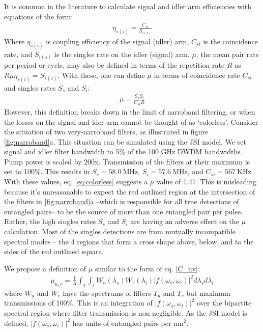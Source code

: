 \documentclass[11pt]{caltech_thesis} %
\begin{document}
It is common in the literature to calculate signal and idler arm efficiencies with equations of the form:
\begin{align}
\eta_{s(i)}=\frac{C_{s i}}{S_{i(s)}} \label{regular_eff}
\end{align}
Where $\eta_{s(i)}$ is coupling efficiency of the signal (idler) arm, $C_{s i}$ is the coincidence rate, and $S_{i(s)}$ is the singles rate on the idler (signal) arm. $\mu$, the mean pair rate per period or cycle, may also be defined in terms of the repetition rate $R$ as $R \mu \eta_{s(i)}=S_{s(i)}$. With these, one can define $\mu$ in terms of coincidence rate $C_{s i}$ and singles rates $S_s$ and $S_i$:
\begin{align}
    \mu=\frac{S_s S_i}{C_{s i} R} \label{eq:colorless}
\end{align}
However, this definition breaks down in the limit of narroband filtering, or when the losses on the signal and ider arm cannot be thought of as `colorless'. Consider the situation of two very-narroband filters, as illustrated in figure \ref{fig:narroband}a. This situation can be simulated using the JSI model. We set signal and idler filter bandwidth to 5\% of the 100 GHz DWDM bandwidths. Pump power is scaled by 200x. Transmission of the filters at their maximum is set to 100\%. This results in $S_s = 58.0~\mathrm{MHz}$, $S_i = 57.6~\mathrm{MHz}$, and $C_{s i} = 567~\mathrm{KHz}$. With these values, eq. \ref{eq:colorless} suggests a $\mu$ value of 1.47. This is misleading because it's unreasonable to expect the red outlined region at the intersection of the filters in \ref{fig:narroband}a --which is responsible for all true detections of entangled pairs-- to be the source of more than one entangled pair per pulse. Rather, the high singles rates $S_s$ and $S_i$ are having an adverse effect on the $\mu$ calculation. Most of the singles detections are from mutually incompatible spectral modes -- the 4 regions that form a cross shape above, below, and to the sides of the red outlined square.

We propose a definition of $\mu$ similar to the form of eq. \ref{C_uv}:
\begin{align}
    \mu_{u,v} = \frac{1}{R}\int_{s}\int_{i}W_u(\lambda_s)W_v(\lambda_i)|f(\omega_s, \omega_i)|^2 d\lambda_s d\lambda_i \label{newmu}
\end{align}
where $W_u$ and $W_v$ have the spectrums of filters $T_u$ and $T_v$ but maximum transmissions of 100\%. This is an integration of $|f(\omega_s, \omega_i)|^2$ over the bipartite spectral region where filter transmission is non-negligible. As the JSI model is defined, $|f(\omega_s, \omega_i)|^2$ has units of entangled pairs per $\mathrm{nm}^2$.
\end{document}
